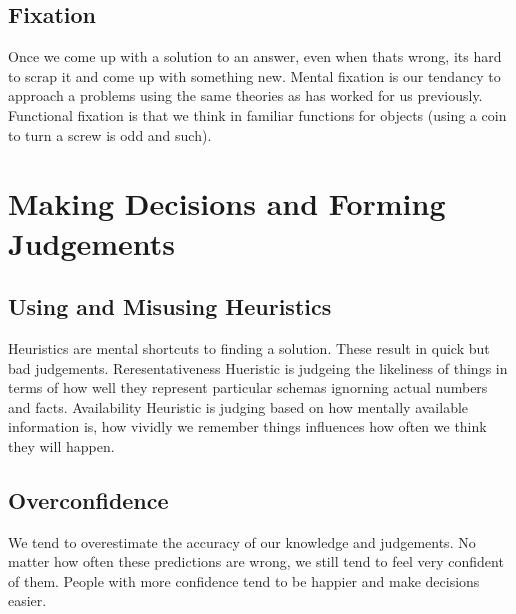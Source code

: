 \documentclass[12pt]{article}
\begin{document}
\subsection*{Fixation} Once we come up with a solution to an answer, even when thats wrong, its hard to scrap it and come up with something new. Mental fixation is our tendancy to approach a problems using the same theories as has worked for us previously. Functional fixation is that we think in familiar functions for objects (using a coin to turn a screw is odd and such).
\section*{Making Decisions and Forming Judgements}
\subsection*{Using and Misusing Heuristics} Heuristics are mental shortcuts to finding a solution. These result in quick but bad judgements. Reresentativeness Hueristic is judgeing the likeliness of things in terms of how well they represent particular schemas ignorning actual numbers and facts. Availability Heuristic is judging based on how mentally available information is, how vividly we remember things influences how often we think they will happen.
\subsection*{Overconfidence} We tend to overestimate the accuracy of our knowledge and judgements. No matter how often these predictions are wrong, we still tend to feel very confident of them. People with more confidence tend to be happier and make decisions easier. 
\end{document}
